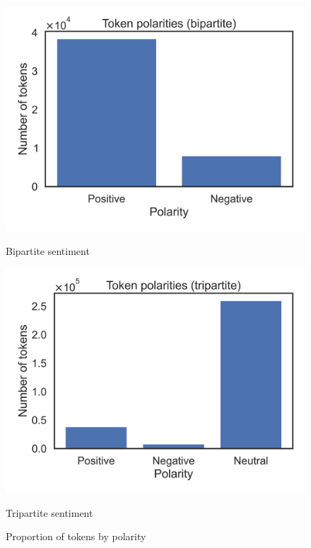 \documentclass[11pt, a4paper]{pancake-article}
\begin{document}
\begin{figure}[htpb]
  \centering
  \begin{minipage}{0.5\textwidth}
    \centering
    \includegraphics[width=\textwidth]{../results/old/bar_bipartite.png}
    \caption*{Bipartite sentiment}
  \end{minipage}\hfill
  \begin{minipage}{0.5\textwidth}
    \centering
    \includegraphics[width=\textwidth]{../results/old/bar_tripartite.png}
    \caption*{Tripartite sentiment}
  \end{minipage}
  \caption{Proportion of tokens by polarity}
  \label{fig:bars}
\end{figure}
\end{document}
